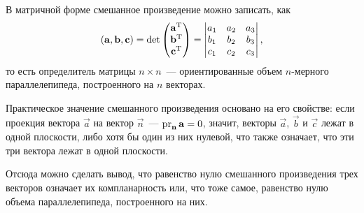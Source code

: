 В матричной форме смешанное произведение можно записать, как
\begin{equation}
    \left( \mathbf{a}, \mathbf{b}, \mathbf{c} \right) = \det
    \begin{pmatrix}
        \mathbf{a}^{\operatorname{T}}\\
        \mathbf{b}^{\operatorname{T}}\\
        \mathbf{c}^{\operatorname{T}}
    \end{pmatrix} =
    \begin{vmatrix}
        a_1 & a_2 & a_3\\
        b_1 & b_2 & b_3\\
        c_1 & c_2 & c_3
    \end{vmatrix},
\end{equation}
то есть определитель матрицы $n \times n$~--- ориентированные объем $n$-мерного параллелепипеда, построенного на $n$ векторах.

Практическое значение смешанного произведения основано на его свойстве: если проекция вектора $\vec{a}$ на вектор $\vec{n}$~--- $\operatorname{pr}_{\mathbf{n}} \mathbf{a} = 0$, значит, векторы $\vec{a}$, $\vec{b}$ и $\vec{c}$ лежат в одной плоскости, либо хотя бы один из них нулевой, что также означает, что эти три вектора лежат в одной плоскости.

Отсюда можно сделать вывод, что равенство нулю смешанного произведения трех векторов означает их компланарность или, что тоже самое, равенство нулю объема параллелепипеда, построенного на них.
